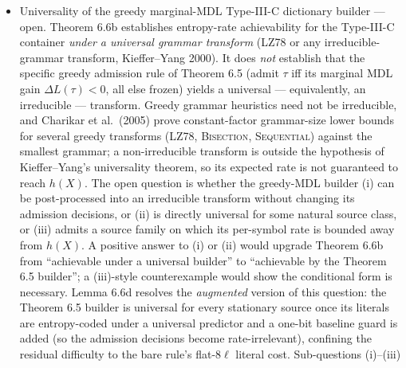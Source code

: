 \documentclass[
]{article}
\begin{document}
\begin{itemize}
  We retract any rigorous claim of asymptotic-strong-form closure of
  Conjecture 6.8d via escape-savings accounting. The right statement
  remains the conservative ``some $\varepsilon_{\mathrm{bit}} > 0$''
  weak form, with the K-optimisation obstacle a documented research
  direction. Resolving it requires either: (a) demonstrating that
  the Berman-Karpinski reduction can be modified to preserve the
  symbol-count gap at the $K = \sqrt{N}$ bit-cost-optimal regime;
  (b) using a different source-of-hardness problem that admits
  $K$-uniform gap preservation; or (c) proving an exponential-type
  lower bound on $L_{\mathrm{sym}}(K^*)$ for NO instances under
  Berman-Karpinski-hard inputs. All three are open research-level
  directions.
\item
  Universality of the greedy marginal-MDL Type-III-C dictionary builder
  --- open. Theorem 6.6b establishes entropy-rate achievability for the
  Type-III-C container \emph{under a universal grammar transform} (LZ78
  or any irreducible-grammar transform, Kieffer--Yang 2000). It does
  \emph{not} establish that the specific greedy admission rule of
  Theorem 6.5 (admit $\tau$ iff its marginal MDL gain $\Delta L(\tau) <
  0$, all else frozen) yields a universal --- equivalently, an
  irreducible --- transform. Greedy grammar heuristics need not be
  irreducible, and Charikar et al.\ (2005) prove constant-factor
  grammar-size lower bounds for several greedy transforms (LZ78,
  \textsc{Bisection}, \textsc{Sequential}) against the smallest grammar;
  a non-irreducible transform is outside the hypothesis of
  Kieffer--Yang's universality theorem, so its expected rate is not
  guaranteed to reach $h(X)$. The open question is whether the
  greedy-MDL builder (i) can be post-processed into an irreducible
  transform without changing its admission decisions, or (ii) is
  directly universal for some natural source class, or (iii) admits a
  source family on which its per-symbol rate is bounded away from
  $h(X)$. A positive answer to (i) or (ii) would upgrade Theorem 6.6b
  from ``achievable under a universal builder'' to ``achievable by the
  Theorem 6.5 builder''; a (iii)-style counterexample would show the
  conditional form is necessary. Lemma 6.6d resolves the \emph{augmented}
  version of this question: the Theorem 6.5 builder is universal for every
  stationary source once its literals are entropy-coded under a universal
  predictor and a one-bit baseline guard is added (so the admission
  decisions become rate-irrelevant), confining the residual difficulty to
  the bare rule's flat-$8\ell$ literal cost. Sub-questions (i)--(iii)

\end{itemize}
\end{document}

